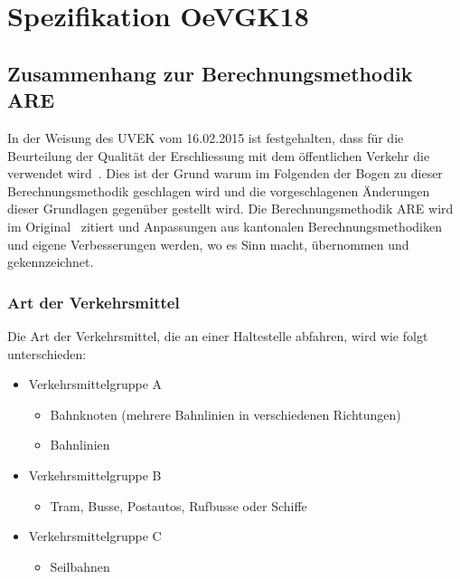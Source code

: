 
\section{Spezifikation OeVGK18}
\label{Spezifikation OeVGK18}

\subsection{Zusammenhang zur Berechnungsmethodik ARE}
\label{Spezifikation OeVGK18:Zusammenhang zur Berechnungsmethodik ARE}

In der Weisung des \acs{UVEK} vom 16.02.2015 ist festgehalten, dass für die Beurteilung der Qualität der Erschliessung mit dem öffentlichen Verkehr die  verwendet wird~\cite{weisung_uvek}.
Dies ist der Grund warum im Folgenden der Bogen zu dieser Berechnungsmethodik geschlagen wird und die vorgeschlagenen Änderungen dieser Grundlagen gegenüber gestellt wird.
Die Berechnungsmethodik \acs{ARE} wird im Original~\cite{berechnung_are} zitiert und Anpassungen aus kantonalen Berechnungsmethodiken und eigene Verbesserungen werden, wo es Sinn macht, übernommen und gekennzeichnet.

\subsubsection{Art der Verkehrsmittel}
\label{Zusammenhang zur Berechnungsmethodik ARE:Art der Verkehrsmittel}

\begin{itquote}
Die Art der Verkehrsmittel, die an einer Haltestelle abfahren, wird wie folgt unterschieden:
\begin{itemize}[noitemsep]
    \item Verkehrsmittelgruppe A
    \begin{itemize}
        \item Bahnknoten (mehrere Bahnlinien in verschiedenen Richtungen)
        \item Bahnlinien
    \end{itemize}
    \item Verkehrsmittelgruppe B
    \begin{itemize}
        \item Tram, Busse, Postautos, Rufbusse oder Schiffe
    \end{itemize}
    \item Verkehrsmittelgruppe C
    \begin{itemize}
        \item Seilbahnen
    \end{itemize}
\end{itemize}
\end{itquote}

